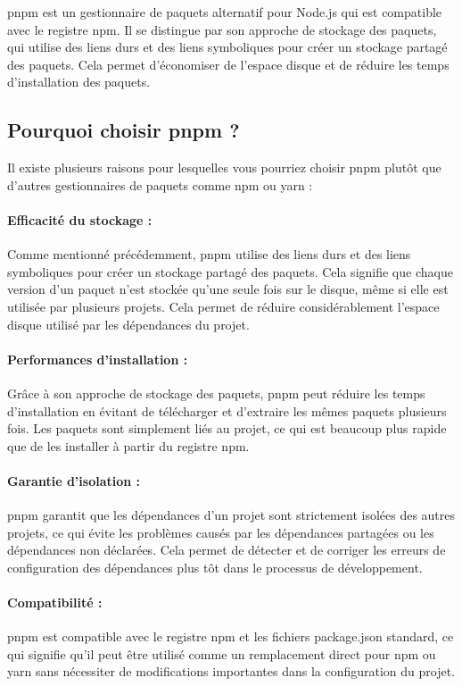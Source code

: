pnpm\cite{MotivationPnpm} est un gestionnaire de paquets alternatif pour Node.js qui est compatible avec le registre npm. Il se distingue par son approche de stockage des paquets, qui utilise des liens durs et des liens symboliques pour créer un stockage partagé des paquets. Cela permet d'économiser de l'espace disque et de réduire les temps d'installation des paquets.

\subsection{Pourquoi choisir pnpm ?}

Il existe plusieurs raisons pour lesquelles vous pourriez choisir pnpm plutôt que d'autres gestionnaires de paquets comme npm ou yarn :

\paragraph{Efficacité du stockage :} Comme mentionné précédemment, pnpm utilise des liens durs et des liens symboliques pour créer un stockage partagé des paquets. Cela signifie que chaque version d'un paquet n'est stockée qu'une seule fois sur le disque, même si elle est utilisée par plusieurs projets. Cela permet de réduire considérablement l'espace disque utilisé par les dépendances du projet.
\paragraph{Performances d'installation :} Grâce à son approche de stockage des paquets, pnpm peut réduire les temps d'installation en évitant de télécharger et d'extraire les mêmes paquets plusieurs fois. Les paquets sont simplement liés au projet, ce qui est beaucoup plus rapide que de les installer à partir du registre npm.
\paragraph{Garantie d'isolation :} pnpm garantit que les dépendances d'un projet sont strictement isolées des autres projets, ce qui évite les problèmes causés par les dépendances partagées ou les dépendances non déclarées. Cela permet de détecter et de corriger les erreurs de configuration des dépendances plus tôt dans le processus de développement.
\paragraph{Compatibilité :} pnpm est compatible avec le registre npm et les fichiers package.json standard, ce qui signifie qu'il peut être utilisé comme un remplacement direct pour npm ou yarn sans nécessiter de modifications importantes dans la configuration du projet.

